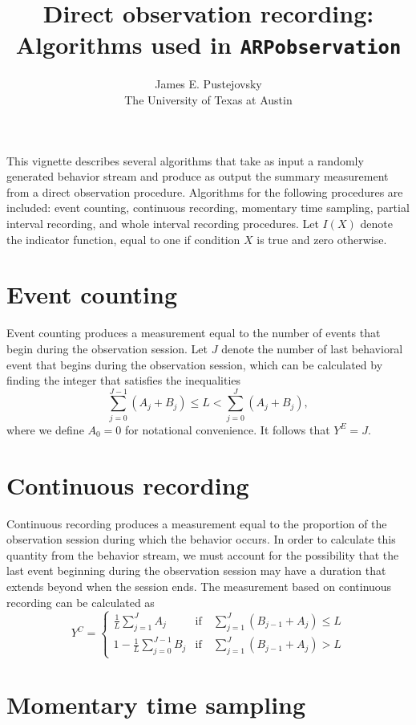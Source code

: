 \documentclass{article}\usepackage[]{graphicx}\usepackage[]{color}
\author{James E. Pustejovsky\\The University of Texas at Austin}
\title{Direct observation recording: Algorithms used in \texttt{ARPobservation}}
\begin{document}
\maketitle

This vignette describes several algorithms that take as input a randomly generated behavior stream and produce as output the summary measurement from a direct observation procedure. Algorithms for the following procedures are included: event counting, continuous recording, momentary time sampling, partial interval recording, and whole interval recording procedures. Let $I(X)$ denote the indicator function, equal to one if condition $X$ is true and zero otherwise. 

\section{Event counting}

Event counting produces a measurement equal to the number of events that begin during the observation session. Let $J$ denote the number of last behavioral event that begins during the observation session, which can be calculated by finding the integer that satisfies the inequalities \[
\sum_{j=0}^{J-1} \left(A_j + B_j \right) \leq L < \sum_{j=0}^{J} \left(A_j + B_j \right), \]
where we define $A_0 = 0$ for notational convenience. It follows that $Y^E = J$. 

\section{Continuous recording}

Continuous recording produces a measurement equal to the proportion of the observation session during which the behavior occurs. In order to calculate this quantity from the behavior stream, we must account for the possibility that the last event beginning during the observation session may have a duration that extends beyond when the session ends. The measurement based on continuous recording can be calculated as\[
Y^C = \begin{cases}
\frac{1}{L} \sum_{j=1}^J A_j & \text{if}\quad \sum_{j=1}^{J} \left(B_{j-1} + A_j\right) \leq L \\
1 - \frac{1}{L} \sum_{j=0}^{J-1} B_j & \text{if}\quad \sum_{j=1}^{J} \left(B_{j-1} + A_j\right) > L
\end{cases} \]


\section{Momentary time sampling}
\end{document}
